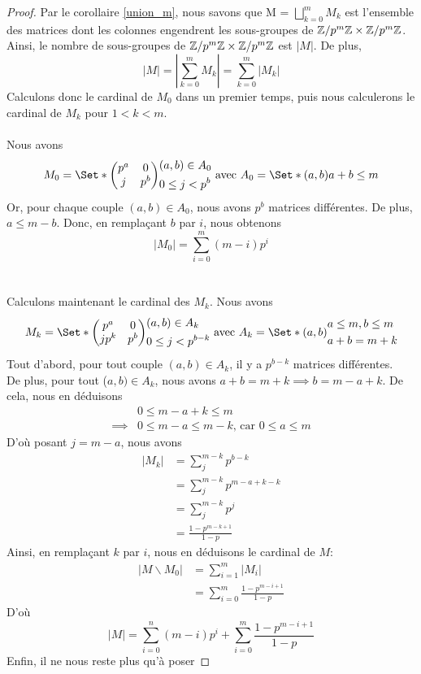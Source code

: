 \documentclass[12pt]{article}
\newcommand{\ZpmZ}{\Z/p^m\Z}
\newcommand{\ZZpm}{\ZpmZ \x \ZpmZ}
\newcommand{\Mz}{\Set*{
	\begin{pmatrix}
		p^a  & 0   \\
		j & p^b
	\end{pmatrix}
}{
	\begin{aligned}
		 & (a, b) \in A_0      \\
		 & 0 \le j < p^{b}
	\end{aligned}
}}
\newcommand{\Mk}{\Set*{
	\begin{pmatrix}
		p^a  & 0   \\
		jp^k & p^b
	\end{pmatrix}
}{
	\begin{aligned}
		 & (a, b) \in A_k      \\
		 & 0 \le j < p^{b - k}
	\end{aligned}
}}
\newcommand{\Az}{\Set*{(a,b)}{ a + b \le m}}
\newcommand{\Ak}{\Set*{
	(a,b)}{
	\begin{aligned}
		 & a \le m, b \le m \\
		 & a + b = m + k
	\end{aligned}
}}
\begin{document}
\begin{proof}
	Par le corollaire \ref{union_m}, nous savons que M = $\bigsqcup\limits_{k = 0}^{m} M_k$
	est l'ensemble des matrices dont les colonnes engendrent les sous-groupes de $\ZZpm$.
	Ainsi, le nombre de sous-groupes de $\ZZpm$ est $|M|$.
	De plus,
	$$|M| = |\sum_{k=0}^{m} M_k| = \sum_{k=0}^{m}|M_k|$$
	\noindent
	Calculons donc le cardinal de $M_0$ dans un premier temps, puis nous calculerons
	le cardinal de $M_k$ pour $1 < k < m$.\\\vspace*{1cm}\\
	Nous avons $$M_0 =\Mz \text{ avec } A_0 = \Az$$
	Or, pour chaque couple $(a,b) \in A_0$, nous avons $p^b$ matrices différentes.
	De plus, $a \le m - b$. Donc, en remplaçant $b$ par $i$, nous obtenons
	$$ |M_0| = \sum_{i=0}^{m}(m-i)p^i$$
	\\\vspace*{1cm}\\
	Calculons maintenant le cardinal des $M_k$. Nous avons
	$$M_k = \Mk \text{ avec } A_k = \Ak$$
	Tout d'abord, pour tout couple $(a,b) \in A_k$, il y a $p^{ b-k}$ matrices différentes.\\
	De plus, pour tout ($a,b) \in A_k$, nous avons
	$a + b = m + k \implies b = m - a +k$. De cela, nous en déduisons
	\begin{equation*}
		\begin{aligned}
			         & 0 \le m - a + k \le m                             \\
			\implies & 0\le m - a \le m - k \text{, car  } 0 \le a \le m
		\end{aligned}
	\end{equation*}
	D'où posant $j = m - a$, nous avons
	\begin{equation*}
		\begin{split}
			|M_k| &= \sum_{j}^{m - k}p^{b-k}\\
			&= \sum_{j}^{m - k}p^{m - a + k - k}\\
			&= \sum_{j}^{m - k}p^{j}\\
			&= \frac{1 - p^{m-k+1}}{1-p}
		\end{split}
	\end{equation*}
	Ainsi, en remplaçant $k$ par $i$, nous en déduisons le cardinal de $M$:
	\begin{equation*}
		\begin{split}
			|M \backslash M_0| &= \sum_{i=1}^{m}|M_i|\\
			&= \sum_{i=0}^{m}\frac{1 - p^{m-i+1}}{1-p}
		\end{split}
	\end{equation*}
	D'où
	$$|M| = \sum_{i=0}^{n}(m-i)p^i + \sum_{i = 0}^{m}\frac{1- p^{m-i+1}}{1 - p}$$
	Enfin, il ne nous reste plus qu'à poser
\end{proof}
\end{document}
